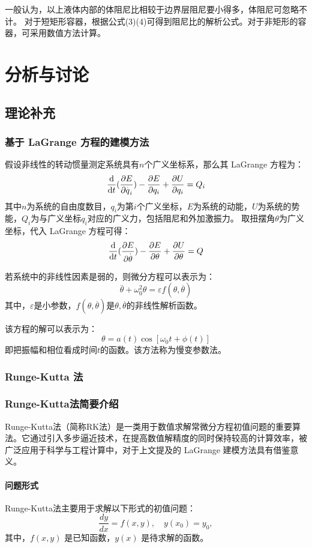 \documentclass[12pt,hyperref,a4paper,UTF8]{ctexart}
\begin{document}
\begin{itemize}
        一般认为，以上液体内部的体阻尼比相较于边界层阻尼要小得多，体阻尼可忽略不计。  
        对于短矩形容器，根据公式(3)(4)可得到阻尼比的解析公式。对于非矩形的容器，可采用数值方法计算。

\section{分析与讨论}

\subsection{理论补充}
\subsubsection{基于 LaGrange 方程的建模方法}
假设非线性的转动惯量测定系统具有$n$个广义坐标系，那么其 LaGrange 方程为：
$$ \frac{\text d}{\text dt}(\frac{\partial E}{\partial\overset{.}q_i})-\frac{\partial E}{\partial q_i}+\frac{\partial U}{\partial q_i}=Q_i $$
其中$n$为系统的自由度数目，$q_i$为第$i$个广义坐标，$E$为系统的动能，$U$为系统的势能，$Q_i$为与广义坐标$q_i$对应的广义力，包括阻尼和外加激振力。
取扭摆角$\theta$为广义坐标，代入 LaGrange 方程可得：
$$ \frac{\text d}{\text dt}(\frac{\partial E}{\partial\overset{.}\theta})-\frac{\partial E}{\partial \theta}+\frac{\partial U}{\partial \theta}=Q $$

若系统中的非线性因素是弱的，则微分方程可以表示为：
$$ \overset{..}\theta+\omega_0^2\theta=\varepsilon f(\theta,\overset{.}\theta) $$
其中，$\varepsilon$是小参数，$f(\theta,\overset{.}\theta)$是$\theta,\overset{.}\theta$的非线性解析函数。

该方程的解可以表示为：
$$ \theta=a(t)\cos[\omega_0t+\phi(t)] $$
即把振幅和相位看成时间$t$的函数。该方法称为慢变参数法。
\subsubsection{Runge-Kutta 法}
\subsubsection*{Runge-Kutta法简要介绍}

Runge-Kutta法（简称RK法）是一类用于数值求解常微分方程初值问题的重要算法。它通过引入多步逼近技术，在提高数值解精度的同时保持较高的计算效率，被广泛应用于科学与工程计算中，对于上文提及的 LaGrange 建模方法具有借鉴意义。

\paragraph{问题形式}
Runge-Kutta法主要用于求解以下形式的初值问题：
\[
\frac{dy}{dx} = f(x, y), \quad y(x_0) = y_0,
\]
其中，\( f(x, y) \) 是已知函数，\( y(x) \) 是待求解的函数。


\end{itemize}
\end{document}
